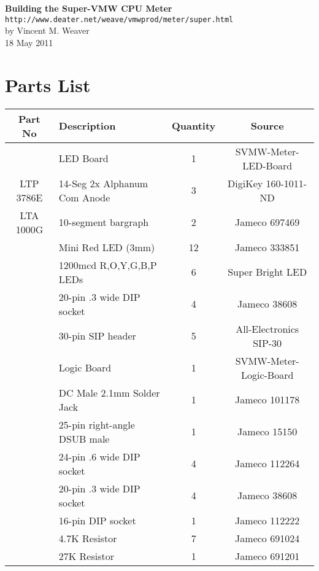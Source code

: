 \documentclass[11pt]{article}
\begin{document}
\begin{center}
{\Large \bf Building the Super-VMW CPU Meter}\\
{\tt http://www.deater.net/weave/vmwprod/meter/super.html}\\
by Vincent M. Weaver\\
18 May 2011
\end{center}


\section{Parts List}

\begin{tabular}{|c|l|c|c|}
\hline
Part No   &  Description    &  Quantity    &   Source \\
\hline
\hline

          &  LED Board                 & 1  & SVMW-Meter-LED-Board\\ %
LTP 3786E &  14-Seg 2x Alphanum Com Anode & 3 &  DigiKey 160-1011-ND \\ %
LTA 1000G &  10-segment bargraph       & 2  &  Jameco 697469 \\ %
          &  Mini Red LED (3mm)        & 12 &  Jameco 333851 \\ %
	  &  1200mcd R,O,Y,G,B,P LEDs  & 6  &  Super Bright LED \\ %
	  &  20-pin .3 wide DIP socket & 4  &  Jameco 38608 \\ %
	  &  30-pin SIP header         & 5  &  All-Electronics SIP-30 \\ %
\hline
\hline
          & Logic Board                & 1  & SVMW-Meter-Logic-Board \\ %
	  & DC Male 2.1mm Solder Jack  & 1  &  Jameco 101178 \\ %
	  & 25-pin right-angle DSUB male & 1  &  Jameco 15150 \\ %
	  & 24-pin .6 wide DIP socket  & 4  &  Jameco 112264 \\ %
	  & 20-pin .3 wide DIP socket  & 4  &  Jameco 38608 \\ %
	  & 16-pin DIP socket          & 1  &  Jameco 112222 \\ %
	  & 4.7K Resistor              & 7  &  Jameco 691024 \\ %
	  & 27K Resistor               & 1  &  Jameco 691201 \\ %

\end{tabular}
\end{document}
